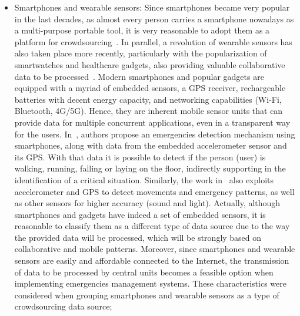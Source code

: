 \begin{refsection}
\begin{itemize}
  \item Smartphones and wearable sensors: Since smartphones became very popular in the last decades, as almost every person carries a smartphone nowadays as a multi-purpose portable tool, it is very reasonable to adopt them as a platform for crowdsourcing~\cite{crowdsourcing1}. In parallel, a revolution of wearable sensors has also taken place more recently, particularly with the popularization of smartwatches and healthcare gadgets, also providing valuable collaborative data to be processed~\cite{wearable1,wearable2,iotgadget1}. Modern smartphones and popular gadgets are equipped with a myriad of embedded sensors, a GPS receiver, rechargeable batteries with decent energy capacity, and networking capabilities (Wi-Fi, Bluetooth, 4G/5G). Hence, they are inherent mobile sensor units that can provide data for multiple concurrent applications, even in a transparent way for the users. In~\cite{crowdsourcing4}, authors propose an emergencies detection mechanism using smartphones, along with data from the embedded accelerometer sensor and its GPS. With that data it is possible to detect if the person (user) is walking, running, falling or laying on the floor, indirectly supporting in the identification of a critical situation. Similarly, the work in~\cite{crowdsourcing4} also exploits accelerometer and GPS to detect movements and emergency patterns, as well as other sensors for higher accuracy (sound and light). Actually, although smartphones and gadgets have indeed a set of embedded sensors, it is reasonable to classify them as a different type of data source due to the way the provided data will be processed, which will be strongly based on collaborative and mobile patterns. Moreover, since smartphones and wearable sensors are easily and affordable connected to the Internet, the transmission of data to be processed by central units becomes a feasible option when implementing emergencies management systems. These characteristics were considered when grouping smartphones and wearable sensors as a type of crowdsourcing data source;
  

\end{itemize}
\end{refsection}
